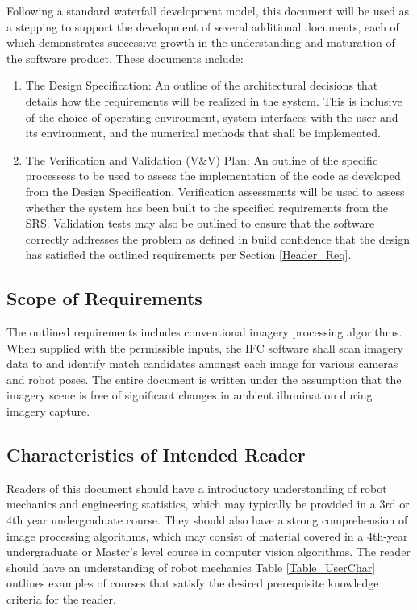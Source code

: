 \documentclass[12pt]{article}
\begin{document}
Following a standard waterfall development model, this document will be used as a 
stepping to support the development of several additional documents, each of which 
demonstrates successive growth in the understanding and maturation of the software 
product. These documents include:
\begin{enumerate}
  \item The Design Specification: An outline of the architectural decisions that 
  details   how the requirements will be realized in the system. This is inclusive 
  of the choice of operating environment, system interfaces with the user and its 
  environment, and the   numerical methods that shall be implemented.

  \item The Verification and Validation (V\&V) Plan: An outline of the specific processess 
  to be used to assess the implementation of the code as developed from the Design 
  Specification. Verification assessments will be used to assess whether the system has been 
  built to the specified requirements from the SRS. Validation tests may also be outlined to 
  ensure that the software correctly addresses the problem as defined in  build confidence 
  that the   design has satisfied the outlined requirements per Section \ref{Header_Req}.
\end{enumerate}


\subsection{Scope of Requirements} 
The outlined requirements includes conventional imagery processing algorithms. When supplied 
with the permissible inputs, the IFC software shall scan imagery data to and 
identify match candidates amongst each image for various cameras and robot poses. The entire 
document is written under the assumption that the imagery scene is free of significant changes 
in ambient illumination during imagery capture.

\subsection{Characteristics of Intended Reader} \label{sec_IntendedReader}
Readers of this document should have a introductory understanding of robot mechanics and 
engineering statistics, which may typically be provided in a 3rd or 4th year undergraduate course. They 
should also have a strong comprehension of image processing algorithms, which may consist of 
material covered in a 4th-year undergraduate or Master's level course in computer vision 
algorithms. The reader should have an understanding of robot mechanics 
Table \ref{Table_UserChar} outlines examples of courses that satisfy 
the desired prerequisite knowledge criteria for the reader. 
\end{document}

